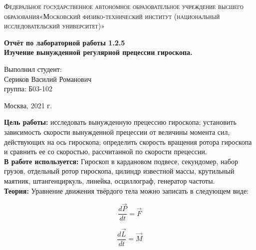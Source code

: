 \documentclass[a4paper, 12pt]{article}%
\begin{document}
	\begin{titlepage}
		\begin{center}
			\textsc{Федеральное государственное автономное образовательное учреждение высшего образования«Московский физико-технический институт (национальный исследовательский университет)»\\[5mm]
			}
			
			\vfill
			
			\textbf{Отчёт по лабораторной работы 1.2.5\\[3mm]
				Изучение вынужденной регулярной прецессии гироскопа.
				\\[50mm]
			}
			
		\end{center}
		
		\hfill
		\begin{minipage}{.5\textwidth}
			Выполнил студент:\\[2mm]
			Сериков Василий Романович\\[2mm]
			группа: Б03-102\\[5mm]
			
		\end{minipage}
		\vfill
		\begin{center}
			Москва, 2021 г.
		\end{center}
		
	\end{titlepage}
	
	\newpage
	\textbf{Цель работы:} исследовать вынужденную прецессию гироскопа; установить зависимость скорости вынужденной прецессии от величины момента сил, действующих на ось гироскопа; определить скорость вращения ротора гироскопа и сравнить ее со скоростью, рассчитанной по скорости прецессии.\\
	\textbf{В работе используется:} Гироскоп в кардановом подвесе, секундомер, набор грузов, отдельный ротор гироскопа, цилиндр известной массы, крутильный маятник, штангенциркуль, линейка, осциллограф, генератор частоты. \\
	\textbf{Теория:}
	Уравнение движения твёрдого тела можно записать в следующем виде:
	
	\begin{equation}
		\frac{d\vec{P}}{dt}=\vec{F}
		\label{one}
	\end{equation}
	
	\begin{equation}
		\frac{d\vec{L}}{dt}=\vec{M}
		\label{two}
	\end{equation}
	
\end{document}
